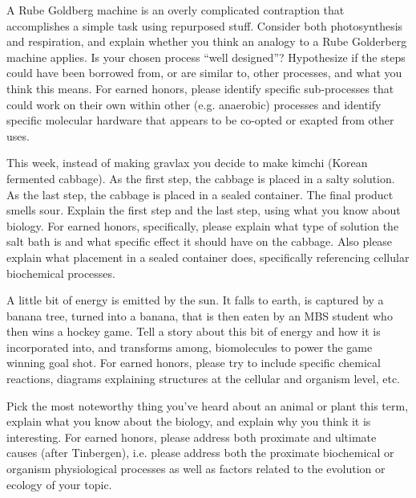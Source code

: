 \documentclass[exam,addpoints,noanswers]{exam}
\begin{document}
\begin{questions}
\clearpage
\question[22] 
A Rube Goldberg machine is an overly complicated contraption that accomplishes a simple task using repurposed stuff. Consider both photosynthesis and respiration, and explain whether you think an analogy to a Rube Golderberg machine applies. Is your chosen process ``well designed''? Hypothesize if the steps could have been borrowed from, or are similar to, other processes, and what you think this means.  For earned honors, please identify specific sub-processes that could work on their own within other (e.g. anaerobic) processes and identify specific molecular hardware that appears to be co-opted or exapted from other uses. 

\clearpage
\question[23] 
This week, instead of making gravlax you decide to make kimchi (Korean fermented cabbage). As the first step, the cabbage is placed in a salty solution. As the last step, the cabbage is placed in a sealed container. The final product smells sour. Explain the first step and the last step, using what you know about biology. For earned honors, specifically, please explain what type of solution the salt bath is and what specific effect it should have on the cabbage. Also please explain what placement in a sealed container does, specifically referencing cellular biochemical processes. 

\clearpage
\question[22] 
A little bit of energy is emitted by the sun. It falls to earth, is captured by a banana tree, turned into a banana, that is then eaten by an MBS student who then wins a hockey game. Tell a story about this bit of energy and how it is incorporated into, and transforms among, biomolecules to power the game winning goal shot. For earned honors, please try to include specific chemical reactions, diagrams explaining structures at the cellular and organism level, etc. 

\clearpage
\question[23] 
Pick the most noteworthy thing you've heard about an animal or plant this term, explain what you know about the biology, and explain why you think it is interesting. For earned honors, please address both proximate and ultimate causes (after Tinbergen), i.e. please address both the proximate biochemical or organism physiological processes as well as factors related to the evolution or ecology of your topic. 
\end{questions}
\end{document}
